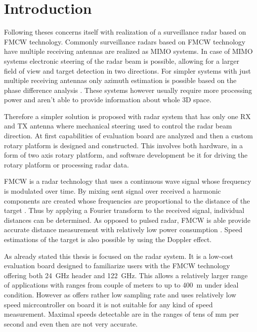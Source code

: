 
\chapter*{Introduction}

Following theses concerns itself with realization of a surveillance radar based on FMCW technology.
Commonly surveillance radars based on FMCW technology have multiple receiving antennas are realized as MIMO systems.
In case of MIMO systems electronic steering of the radar beam is possible, allowing for a larger field of view and target detection in two directions.
For simpler systems with just multiple receiving antennas only azimuth estimation is possible based on the phase difference analysis \cite{sandeep2018}.
These systems however usually require more processing power and aren't able to provide information about whole 3D space.

Therefore a simpler solution is proposed with radar system that has only one RX and TX antenna where mechanical steering used to control the radar beam direction.
At first capabilities of \sidar evaluation board are analyzed and then a custom rotary platform is designed and constructed.
This involves both hardware, in a form of two axis rotary platform, and software development be it for driving the rotary platform or processing radar data.

FMCW is a radar technology that uses a continuous wave signal whose frequency is modulated over time.
By mixing sent signal over received a harmonic components are created whose frequencies are proportional to the distance of the target \cite{graham2005}.
Thus by applying a Fourier transform to the received signal, individual distances can be determined.
As opposed to pulsed radar, FMCW is able provide accurate distance measurement with relatively low power consumption \cite{jankiraman2018}.
Speed estimations of the target is also possible by using the Doppler effect.


As already stated this thesis is focused on the \sidar radar system.
It is a low-cost evaluation board designed to familiarize users with the FMCW technology offering both 24~GHz header and 122~GHz\cite{sidarMAN}.
This allows a relatively larger range of applications with ranges from couple of meters to up to 400~m \cite{sidarMANOld} under ideal condition.
However as \sidar offers rather low sampling rate and uses relatively low speed micrcontroller on board it is not suitable for any kind of speed measurement.
Maximal speeds detectable are in the ranges of tens of mm per second and even then are not very accurate.

